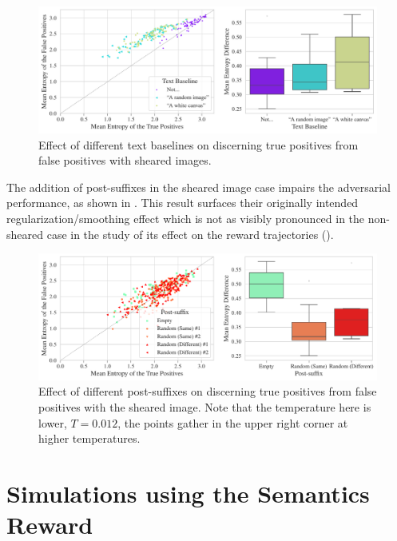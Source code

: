 \begin{figure}[H]
    \centering
    \includegraphics[width=\textwidth]{images/baseline_sheared_adversarial_2.pdf}
    \caption{Effect of different text baselines on discerning true positives from false positives with sheared images.}
    \label{fig:baseline_sheared_adversarial}
\end{figure}

The addition of post-suffixes in the sheared image case impairs the adversarial performance, as shown in .
This result surfaces their originally intended regularization/smoothing effect which is not as visibly pronounced in the non-sheared case in the study of its effect on the reward trajectories ().

\begin{figure}[H]
    \centering
    \includegraphics[width=\textwidth]{images/post-suffix_sheared_adversarial_12.pdf}
    \caption[Effect of different post-suffixes on discerning true positives from false positives with sheared images.]{Effect of different post-suffixes on discerning true positives from false positives with the sheared image. Note that the temperature here is lower, \(T = 0.012\), the points gather in the upper right corner at higher temperatures.}
    \label{fig:post-suffix_sheared_adversarial}
\end{figure}

\section{Simulations using the Semantics Reward}
\label{sec:simulations}

